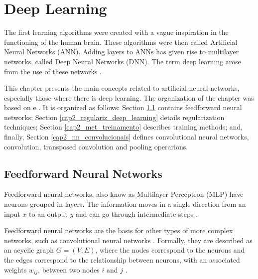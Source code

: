\chapter{Deep Learning}
\label{cap2_redes_neurais}

The first learning algorithms were created with a vague inspiration in the functioning of the human brain.
These algorithms were then called Artificial Neural Networks (\ac{ANN}).
Adding layers to \ac{ANNs} has given rise to multilayer networks, called Deep Neural Networks (\ac{DNN}). 
The term deep learning arose from the use of these networks \cite[Ch. 6]{Goodfellow2016} \cite{ShalevShwartz:2014:UML:2621980}.

This chapter presents the main concepts related to artificial neural networks, especially those where there is deep learning.
The organization of the chapter was based on \cite{Goodfellow2016} e \cite{ShalevShwartz:2014:UML:2621980}. 
It is organized as follows: Section \ref{cap2_nn_feedforward} contains feedforward neural networks; Section \ref{cap2_regulariz_deep_learning} details regularization techniques; Section \ref{cap2_met_treinamento} describes training methods; and, finally, Section \ref{cap2_nn_convolucionais} defines convolutional neural networks, convolution, transposed convolution and pooling operarions.

\section{Feedforward Neural Networks}
\label{cap2_nn_feedforward}

Feedforward neural networks, also know as Multilayer Perceptron (\ac{MLP}) have neurons grouped in layers.
The information moves in a single direction from an input $x$ to an output $y$ and can go through intermediate steps \cite[Ch. 6]{Goodfellow2016}.

Feedforward neural networks are the basis for other types of more complex networks, such as convolutional neural networks \cite[Ch. 6]{Goodfellow2016}. 
Formally, they are described as an acyclic graph $G=(V,E)$, where the nodes correspond to the neurons and the edges correspond to the relationship between neurons, with an associated weights $w_{ij}$, between two nodes $i$ and $j$ \cite{ShalevShwartz:2014:UML:2621980}.

